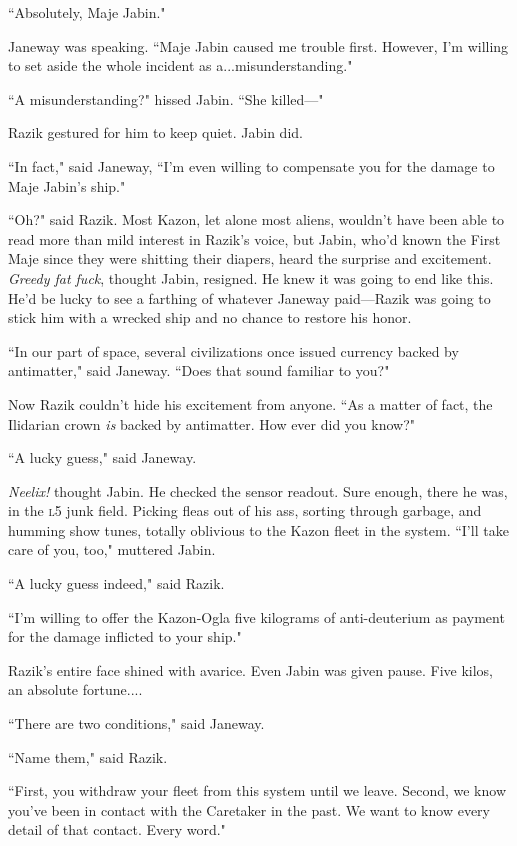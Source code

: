 \documentclass[twoside,letterpaper,12pt]{memoir}
\begin{document}
``Absolutely, Maje Jabin."

Janeway was speaking. ``Maje Jabin caused me trouble first. However, I'm willing to set aside the whole incident as a...misunderstanding."

``A misunderstanding?" hissed Jabin. ``She killed---"

Razik gestured for him to keep quiet. Jabin did.

``In fact," said Janeway, ``I'm even willing to compensate you for the damage to Maje Jabin's ship."

``Oh?" said Razik. Most Kazon, let alone most aliens, wouldn't have been able to read more than mild interest in Razik's voice, but Jabin, who'd known the First Maje since they were shitting their diapers, heard the surprise and excitement. \textit{Greedy fat fuck}, thought Jabin, resigned. He knew it was going to end like this. He'd be lucky to see a farthing of whatever Janeway paid---Razik was going to stick him with a wrecked ship and no chance to restore his honor.

``In our part of space, several civilizations once issued currency backed by antimatter," said Janeway. ``Does that sound familiar to you?"

Now Razik couldn't hide his excitement from anyone. ``As a matter of fact, the Ilidarian crown \textit{is} backed by antimatter. How ever did you know?"

``A lucky guess," said Janeway.

\textit{Neelix!} thought Jabin. He checked the sensor readout. Sure enough, there he was, in the \textsc{l5} junk field. Picking fleas out of his ass, sorting through garbage, and humming show tunes, totally oblivious to the Kazon fleet in the system. ``I'll take care of you, too," muttered Jabin.

``A lucky guess indeed," said Razik.

``I'm willing to offer the Kazon-Ogla five kilograms of anti-deuterium as payment for the damage inflicted to your ship."

Razik's entire face shined with avarice. Even Jabin was given pause. Five kilos, an absolute fortune....

``There are two conditions," said Janeway.

``Name them," said Razik.

``First, you withdraw your fleet from this system until we leave. Second, we know you've been in contact with the Caretaker in the past. We want to know every detail of that contact. Every word."
\end{document}

